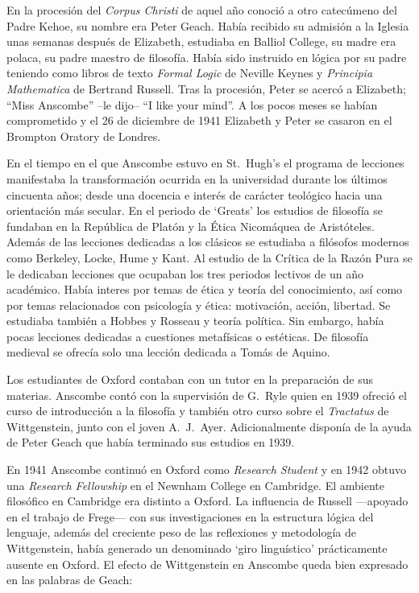 En la procesión del \emph{Corpus Christi} de aquel año conoció a otro catecúmeno del Padre Kehoe, su nombre era Peter Geach. Había recibido su admisión a la Iglesia unas semanas después de Elizabeth, estudiaba en Balliol College, su madre era polaca, su padre maestro de filosofía. Había sido instruido en lógica por su padre teniendo como libros de texto \emph{Formal Logic} de Neville Keynes y \emph{Principia Mathematica} de Bertrand Russell. Tras la procesión, Peter se acercó a Elizabeth; \enquote{Miss Anscombe} --le dijo-- \enquote{I like your mind}.\autocite[Cf.~][187]{kenny2016fellows} A los pocos meses se habían comprometido y el 26 de diciembre de 1941 Elizabeth y Peter se casaron en el Brompton Oratory de Londres.\autocite[Cf.~][33]{teichman2002fellows}

En el tiempo en el que Anscombe estuvo en St.~Hugh's el programa de lecciones manifestaba la transformación ocurrida en la universidad durante los últimos cincuenta años; desde una docencia e interés de carácter teológico hacia una orientación más secular. En el periodo de `Greats' los estudios de filosofía se fundaban en la República de Platón y la Ética Nicomáquea de Aristóteles. Además de las lecciones dedicadas a los clásicos se estudiaba a filósofos modernos como Berkeley, Locke, Hume y Kant. Al estudio de la Crítica de la Razón Pura se le dedicaban lecciones que ocupaban los tres periodos lectivos de un año académico. Había interes por temas de ética y teoría del conocimiento, así como por temas relacionados con psicología y ética: motivación, acción, libertad. Se estudiaba también a Hobbes y Rosseau y teoría política. Sin embargo, había pocas lecciones dedicadas a cuestiones metafísicas o estéticas. De filosofía medieval se ofrecía solo una lección dedicada a Tomás de Aquino.\autocite[Cf.~][23--24]{torralba2005accion}

Los estudiantes de Oxford contaban con un tutor en la preparación de sus materias. Anscombe contó con la supervisión de G.~Ryle quien en 1939 ofreció el curso de introducción a la filosofía y también otro curso sobre el \emph{Tractatus} de Wittgenstein, junto con el joven A.~J.~Ayer. Adicionalmente disponía de la ayuda de Peter Geach que había terminado sus estudios en 1939.\autocite[Cf.~][24]{torralba2005accion}

En 1941 Anscombe continuó en Oxford como \emph{Research Student} y en 1942 obtuvo una \emph{Research Fellowship} en el Newnham College en Cambridge. El ambiente filosófico en Cambridge era distinto a Oxford. La influencia de Russell ---apoyado en el trabajo de Frege--- con sus investigaciones en la estructura lógica del lenguaje, además del creciente peso de las reflexiones y metodología de Wittgenstein, había generado un denominado `giro linguístico'\autocite[Cf.~][14]{geach1991philaut} prácticamente ausente en Oxford. El efecto de Wittgenstein en Anscombe queda bien expresado en las palabras de Geach: 

